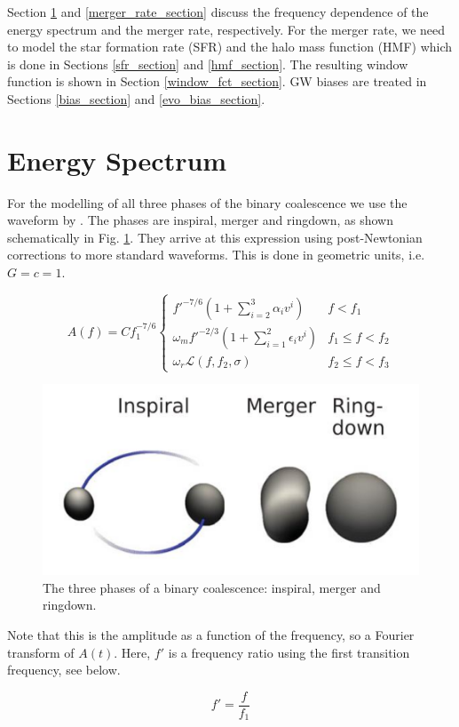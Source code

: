 Section \ref{energy_spectrum_section} and \ref{merger_rate_section} discuss the frequency dependence of the energy spectrum and the merger rate, respectively. For the merger rate, we need to model the star formation rate (SFR) and the halo mass function (HMF) which is done in Sections \ref{sfr_section} and \ref{hmf_section}. The resulting window function is shown in Section \ref{window_fct_section}. GW biases are treated in Sections \ref{bias_section} and \ref{evo_bias_section}.

\section{Energy Spectrum}
\label{energy_spectrum_section}

For the modelling of all three phases of the binary coalescence we use the waveform by \cite{ajith_inspiral-merger-ringdown_2011}. The phases are inspiral, merger and ringdown, as shown schematically in Fig. \ref{IMR_figure}. They arrive at this expression using post-Newtonian corrections to more standard waveforms. This is done in geometric units, i.e. $G=c=1$.

\[ A(f) = C f_1^{-7/6} \begin{cases}
        f'^{-7/6}(1+ \sum_{i=2}^3\alpha_i v^i) & f<f_1 \\
        \omega_m f'^{-2/3}(1+ \sum_{i=1}^2 \epsilon_i v^i) & f_1 \leq f < f_2 \\
        \omega_r \mathcal{L}(f, f_2, \sigma) & f_2 \leq f < f_3
\end{cases}
\]

\begin{figure}
    \centering
    \includegraphics[width=0.5\linewidth]{Images/IMR_figure.png}
    \caption{The three phases of a binary coalescence: inspiral, merger and ringdown.}
    \label{IMR_figure}
\end{figure} 

Note that this is the amplitude as a function of the frequency, so a Fourier transform of $A(t)$.
Here, $f'$ is a frequency ratio using the first transition frequency, see below. 

\begin{equation}
    f'=\frac{f}{f_1}
\end{equation}

